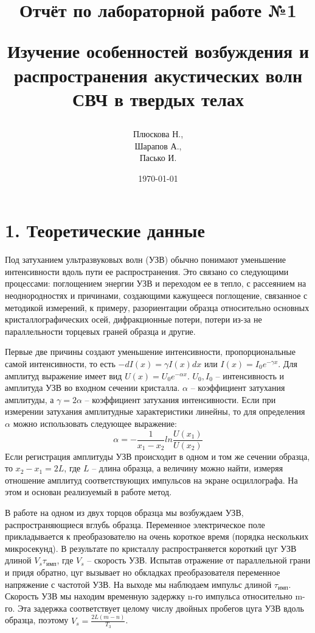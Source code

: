 \documentclass[a4paper,12pt]{report}
\title{Отчёт по лабораторной работе №1

Изучение особенностей возбуждения и распространения акустических волн СВЧ в твердых телах}
\author{Плюскова Н., \\
Шарапов А., \\
Пасько И.}
\date{\today}
\begin{document}
\maketitle


\section*{1. Теоретические данные}
Под затуханием ультразвуковых волн (УЗВ) обычно понимают уменьшение интенсивности вдоль пути ее распространения. Это связано со следующими процессами: поглощением энергии УЗВ и переходом ее в тепло, с рассеянием на неоднородностях и причинами, создающими кажущееся поглощение, связанное с методикой измерений, к примеру, разориентации образца относительно основных кристаллографических осей, дифракционные потери, потери из-за не параллельности торцевых граней образца и другие.

Первые две причины создают уменьшение интенсивности, пропорциональные самой интенсивности, то есть $-dI(x)=\gamma I(x)dx$ или $I(x)=I_{0}e^{-\gamma x}$. Для амплитуд выражение имеет вид $U(x)=U_{0}e^{-\alpha x}$. $U_{0}, I_{0}$ – интенсивность и амплитуда УЗВ во входном сечении кристалла. $\alpha$ – коэффициент затухания амплитуды, а $\gamma=2\alpha$ – коэффициент затухания интенсивности. Если при измерении затухания амплитудные характеристики линейны, то для определения $\alpha$ можно использовать следующее выражение:
\begin{equation*}
\alpha=-\frac{1}{x_{1}-x_{2}}ln\frac{U(x_{1})}{U(x_{2})}
\end{equation*}
Если регистрация амплитуды УЗВ происходит в одном и том же сечении образца, то $x_{2}-x_{1}=2L$, где $L$ – длина образца, а величину можно найти, измеряя отношение амплитуд соответствующих импульсов на экране осциллографа. На этом и основан реализуемый в работе метод.

В работе на одном из двух торцов образца мы возбуждаем УЗВ, распространяющиеся вглубь образца. Переменное электрическое поле прикладывается к преобразователю на очень короткое время (порядка нескольких микросекунд). В результате по кристаллу распространяется короткий цуг УЗВ длиной $V_{s}\tau_{\text{имп}}$, где $V_{s}$ – скорость УЗВ. Испытав отражение от параллельной грани и придя обратно, цуг вызывает но обкладках преобразователя переменное напряжение с частотой УЗВ. На выходе мы наблюдаем импульс длиной $\tau_{\text{имп}}$. Скорость УЗВ мы находим временную задержку n-го импульса относительно m-го. Эта задержка соответствует целому числу двойных пробегов цуга УЗВ вдоль образца, поэтому $V_{s}=\frac{2L(m-n)}{T_{3}}$.
	
\end{document}
